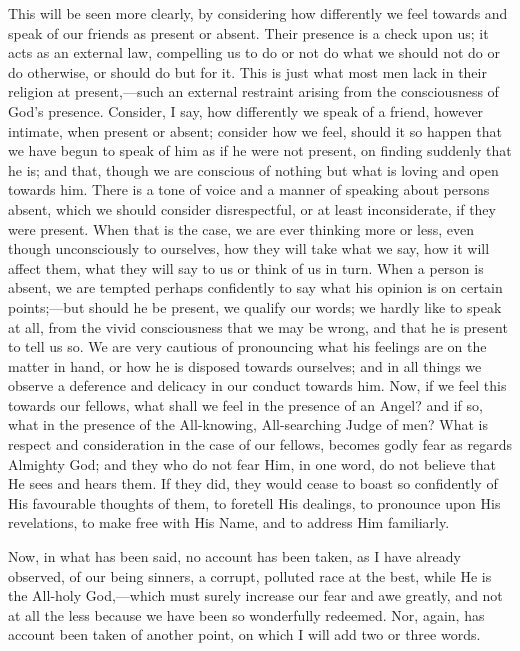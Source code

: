 This will be seen more clearly, by considering how differently we
feel towards and speak of our friends as present or absent. Their
presence is a check upon us; it acts as an external law, compelling us
to do or not do what we should not do or do otherwise, or should do
but for it. This is just what most men lack in their religion at
present,—such an external restraint arising from the consciousness
of God's presence. Consider, I say, how differently we speak of a
friend, however intimate, when present or absent; consider how we
feel, should it so happen that we have begun to speak of him as if he
were not present, on finding suddenly that he is; and that, though we
are conscious of nothing but what is loving and open towards him.
There is a tone of voice and a manner of speaking about persons
absent, which we should consider disrespectful, or at least
inconsiderate, if they were present. When that is the case, we are
ever thinking more or less, even though unconsciously to ourselves,
how they will take what we say, how it will affect them, what they
will say to us or think of us in turn. When a person is absent, we are
tempted perhaps confidently to say what his opinion is on certain
points;—but should he be present, we qualify our words; we hardly
like to speak at all, from the vivid consciousness that we may be
wrong, and that he is present to tell us so. We are very cautious of
pronouncing what his feelings are on the matter in hand, or how he is
disposed towards ourselves; and in all things we observe a deference
and delicacy in our conduct towards him. Now, if we feel this towards
our fellows, what shall we feel in the presence of an Angel? and if
so, what in the presence of the All-knowing, All-searching Judge of
men? What is respect and consideration in the case of our fellows,
becomes godly fear as regards Almighty God; and they who do not fear
Him, in one word, do not believe that He sees and hears them. If they
did, they would cease to boast so confidently of His favourable
thoughts of them, to foretell His dealings, to pronounce upon His
revelations, to make free with His Name, and to address Him
familiarly.

Now, in what has been said, no account has been taken, as I have
already observed, of our being sinners, a corrupt, polluted race at
the best, while He is the All-holy God,—which must surely increase
our fear and awe greatly, and not at all the less because we have been
so wonderfully redeemed. Nor, again, has account been taken of another
point, on which I will add two or three words.

